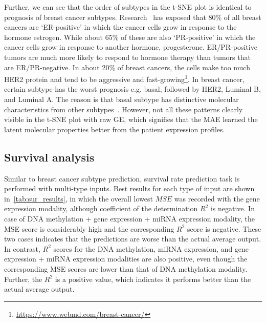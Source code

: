 \hspace*{3.5mm} Further, we can see that the order of subtypes in the t-SNE plot is identical to prognosis of breast cancer subtypes. Research~\cite{91Caruana} has exposed that 80\% of all breast cancers are `ER-positive' in which the cancer cells grow in response to the hormone estrogen. While about 65\% of these are also `PR-positive' in which the cancer cells grow in response to another hormone, progesterone. ER/PR-positive tumors are much more likely to respond to hormone therapy than tumors that are ER/PR-negative. In about 20\% of breast cancers, the cells make too much HER2 protein and tend to be aggressive and fast-growing\footnote{\url{https://www.webmd.com/breast-cancer/}}. In breast cancer, certain subtype has the worst prognosis e.g. basal, followed by HER2, Luminal B, and Luminal A. The reason is that basal subtype has distinctive molecular characteristics from other subtypes~\cite{bertucci2012basal}. However, not all these patterns clearly visible in the t-SNE plot with raw GE, which signifies that the MAE learned the latent molecular properties better from the patient expression profiles.

\subsection{Survival analysis}
\label{secExperimentationAndResults_ResRegression}
Similar to breast cancer subtype prediction, survival rate prediction task is performed with multi-type inputs. Best results for each type of input are shown in~\cref{tab:sur_results}, in which the overall lowest $MSE$ was recorded with the gene expression modality, although coefficient of the determination $R^2$ is negative. In case of DNA methylation + gene expression + miRNA expression modality, the MSE score is considerably high and the corresponding $R^2$ score is negative. These two cases indicates that the predictions are worse than the actual average output. In contrast, $R^2$ scores for the DNA methylation, miRNA expression, and gene expression + miRNA expression modalities are also positive, even though the corresponding MSE scores are lower than that of DNA methylation modality. Further, the $R^2$ is a positive value, which indicates it performs better than the actual average output. 


